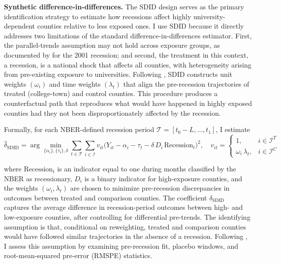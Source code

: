 \noindent \textbf{Synthetic difference-in-differences.} The SDID design serves as the primary identification strategy to estimate how recessions affect highly university-dependent counties relative to less exposed ones. I use SDID because it directly addresses two limitations of the standard difference-in-differences estimator. First, the parallel-trends assumption may not hold across exposure groups, as documented by \citet{jumpResearchUniversitiesRecession} for the 2001 recession; and second, the treatment in this context, a recession, is a national shock that affects all counties, with heterogeneity arising from pre-existing exposure to universities. Following \citet{arkhangelsky2021synthetic}, SDID constructs unit weights $(\omega_i)$ and time weights $(\lambda_t)$ that align the pre-recession trajectories of treated (college-town) and control counties. This procedure produces a counterfactual path that reproduces what would have happened in highly exposed counties had they not been disproportionately affected by the recession.

Formally, for each NBER-defined recession period $\mathcal{T} = [t_0-L, \ldots, t_1]$, I estimate
\begin{equation}
	\label{eq:sdid_reg}
	\hat{\delta}_{\mathrm{SDID}}
	=
	\arg\min_{\{\alpha_i\},\{\tau_t\},\delta}
	\sum_{t\in\mathcal{T}}\sum_{i\in\mathcal{I}}
	v_{it}\big(Y_{it}-\alpha_i-\tau_t-\delta\,D_i\,\text{Recession}_t\big)^2,
	\quad
	v_{it}=
	\begin{cases}
		1, & i\in \mathcal{I}^{T}\\
		\omega_i\,\lambda_t, & i\in \mathcal{I}^{C}
	\end{cases}
\end{equation}

where $\text{Recession}_t$ is an indicator equal to one during months classified by the NBER as recessionary, $D_i$ is a binary indicator for high-exposure counties, and the weights $(\omega_i, \lambda_t)$ are chosen to minimize pre-recession discrepancies in outcomes between treated and comparison counties. The coefficient $\delta_{\text{SDID}}$ captures the average difference in recession-period outcomes between high- and low-exposure counties, after controlling for differential pre-trends. The identifying assumption is that, conditional on reweighting, treated and comparison counties would have followed similar trajectories in the absence of a recession. Following \citet{arkhangelsky2021synthetic}, I assess this assumption by examining pre-recession fit, placebo windows, and root-mean-squared pre-error (RMSPE) statistics. 

